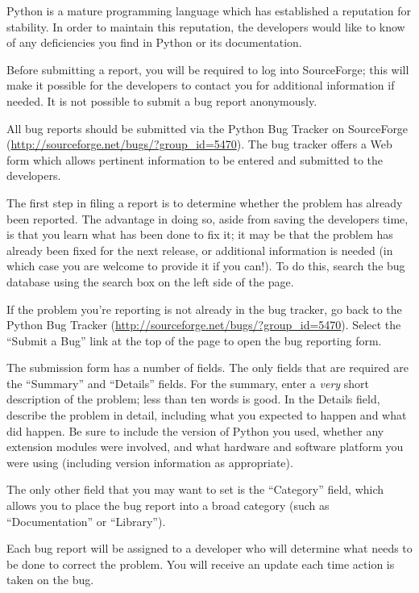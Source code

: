 \label{reporting-bugs}

Python is a mature programming language which has established a
reputation for stability.  In order to maintain this reputation, the
developers would like to know of any deficiencies you find in Python
or its documentation.

Before submitting a report, you will be required to log into SourceForge;
this will make it possible for the developers to contact you
for additional information if needed.  It is not possible to submit a
bug report anonymously.

All bug reports should be submitted via the Python Bug Tracker on
SourceForge (\url{http://sourceforge.net/bugs/?group_id=5470}).  The
bug tracker offers a Web form which allows pertinent information to be
entered and submitted to the developers.

The first step in filing a report is to determine whether the problem
has already been reported.  The advantage in doing so, aside from
saving the developers time, is that you learn what has been done to
fix it; it may be that the problem has already been fixed for the next
release, or additional information is needed (in which case you are
welcome to provide it if you can!).  To do this, search the bug
database using the search box on the left side of the page.

If the problem you're reporting is not already in the bug tracker, go
back to the Python Bug Tracker
(\url{http://sourceforge.net/bugs/?group_id=5470}).  Select the
``Submit a Bug'' link at the top of the page to open the bug reporting
form.

The submission form has a number of fields.  The only fields that are
required are the ``Summary'' and ``Details'' fields.  For the summary,
enter a \emph{very} short description of the problem; less than ten
words is good.  In the Details field, describe the problem in detail,
including what you expected to happen and what did happen.  Be sure to
include the version of Python you used, whether any extension modules
were involved, and what hardware and software platform you were using
(including version information as appropriate).

The only other field that you may want to set is the ``Category''
field, which allows you to place the bug report into a broad category
(such as ``Documentation'' or ``Library'').

Each bug report will be assigned to a developer who will determine
what needs to be done to correct the problem.  You will
receive an update each time action is taken on the bug.


